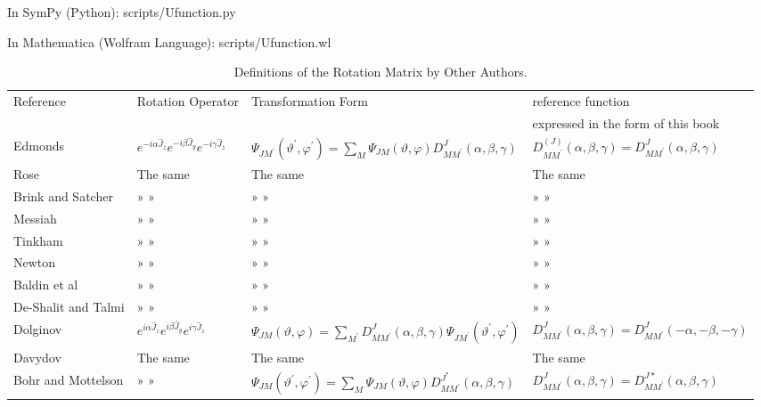 In SymPy (Python): scripts/Ufunction.py
%

In Mathematica (Wolfram Language): scripts/Ufunction.wl
%

\begin{table}[tbhp]
\begin{center}
\caption{Definitions of the Rotation Matrix by Other Authors.}
\label{chap4:tab:2}
\renewcommand{\arraystretch}{1.5}
\footnotesize
\begin{tabular}{p{1.8cm}|l|l|l}
\hline
Reference & Rotation Operator & Transformation Form & reference function\\
& & & expressed in the form of this book\\
\hline
Edmonds \cite{ref016} & $e^{-i \alpha \hat{J}_z} e^{-i \beta \hat{J}_y} e^{-i \gamma \hat{J}_{z}}$ & $\Psi_{J M^{\prime}}\left(\vartheta^{\prime}, \varphi^{\prime}\right)=\sum_{M} \Psi_{J M}(\vartheta, \varphi) D_{M M^{\prime}}^{J}(\alpha, \beta, \gamma)$ & $D_{M M^{\prime}}^{(J)}(\alpha, \beta, \gamma)=D_{M M^{\prime}}^{J}(\alpha, \beta, \gamma)$ \\
Rose \cite{ref031} & The same & The same & The same \\
Brink and Satcher \cite{ref009} & » » & » » & » » \\
Messiah \cite{ref025} & » » & » » & » » \\
Tinkham \cite{ref039} & » » & » » & » » \\
Newton \cite{ref028} & » » & » » & » » \\
Baldin et al \cite{ref003} & » » & » » & » » \\
De-Shalit and Talmi \cite{ref032} & » » & » » & » » \\
Dolginov \cite{ref014} & $e^{i \alpha \hat{J}_z} e^{i \beta \hat{J}_y} e^{i \gamma \hat{J}_{z}}$ & $\Psi_{J M}(\vartheta, \varphi)=\sum_{M^{\prime}} D_{M M^{\prime}}^{J}(\alpha, \beta, \gamma) \Psi_{J M^{\prime}}\left(\vartheta^{\prime}, \varphi^{\prime}\right)$ & $D_{M M^{\prime}}^{J}(\alpha, \beta, \gamma)=D_{M M^{\prime}}^{J}(-\alpha,-\beta,-\gamma)$ \\
Davydov \cite{ref012} & The same & The same & The same \\
Bohr and Mottelson \cite{ref008} & » » & $\Psi_{J M}\left(\vartheta^{\prime}, \varphi^{\prime}\right)=\sum_{M} \Psi_{J M}(\vartheta, \varphi) D_{M M^{\prime}}^{J^{*}}(\alpha, \beta, \gamma)$ & $D_{M M^{\prime}}^{J}(\alpha, \beta, \gamma)=D_{M M^{\prime}}^{J *}(\alpha, \beta, \gamma)$ \\

\end{tabular}
\end{center}
\end{table}

